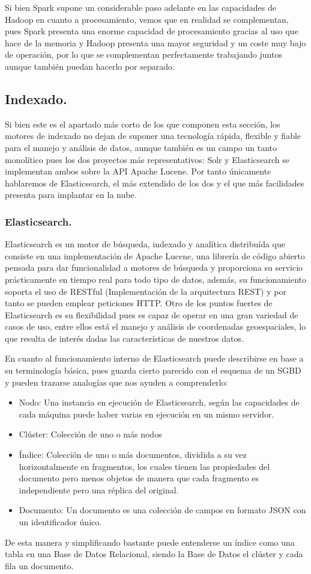 \documentclass[11pt, a4paper]{article} %
\begin{document}
Si bien Spark supone un considerable paso adelante en las capacidades de Hadoop en cuanto a procesamiento, vemos que en realidad se complementan, pues Spark presenta una enorme capacidad de procesamiento gracias al uso que hace de la memoria y Hadoop presenta una mayor seguridad y un coste muy bajo de operación, por lo que se complementan perfectamente trabajando juntos aunque también puedan hacerlo por separado.
\subsection{Indexado.}
Si bien este es el apartado más corto de los que componen esta sección, los motores de indexado no dejan de suponer una tecnología rápida, flexible y fiable para el manejo y análisis de datos, aunque también es un campo un tanto monolítico pues los dos proyectos más representativos: Solr y Elasticsearch se implementan ambos sobre la API Apache Lucene. Por tanto únicamente hablaremos de Elasticsearch, el más extendido de los dos y el que más facilidades presenta para implantar en la nube. 
\subsubsection{Elasticsearch.}
Elasticsearch es un motor de búsqueda, indexado y analítica distribuída que consiste en una implementación de Apache Lucene, una librería de código abierto pensada para dar funcionalidad a motores de búsqueda y proporciona su servicio prácticamente en tiempo real para todo tipo de datos, además, su funcionamiento soporta el uso de RESTful (Implementación de la arquitectura REST) y por tanto se pueden emplear peticiones HTTP. Otro de los puntos fuertes de Elasticsearch es su flexibilidad pues es capaz de operar en una gran variedad de casos de uso, entre ellos está el manejo y análisis de coordenadas geoespaciales, lo que resulta de interés dadas las características de nuestros datos. \cite{elastic}


En cuanto al funcionamiento interno de Elasticsearch puede describirse en base a su terminología básica, pues guarda cierto parecido con el esquema de un SGBD y pueden trazarse analogías que nos ayuden a comprenderlo: \cite{elastic}
\begin{itemize}
\item Nodo: Una instancia en ejecución de Elasticsearch, según las capacidades de cada máquina puede haber varias en ejecución en un mismo servidor.
\item Clúster: Colección de uno o más nodos
\item Índice: Colección de uno o más documentos, dividida a su vez horizontalmente en fragmentos, los cuales tienen las propiedades del documento pero menos objetos de manera que cada fragmento es independiente pero una réplica del original.
\item Documento: Un documento es una colección de campos en formato JSON con un identificador único.
\end{itemize}
De esta manera y simplificando bastante puede entenderse un índice como una tabla en una Base de Datos Relacional, siendo la Base de Datos el clúster y cada fila un documento.
\end{document}
